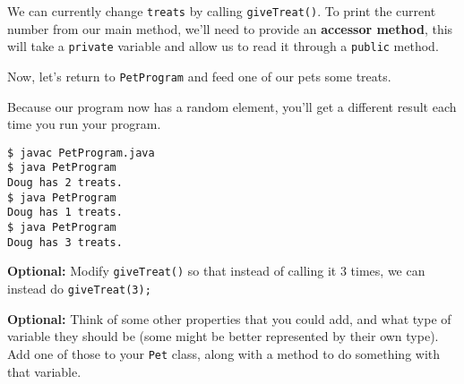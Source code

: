 			We can currently change \texttt{treats} by calling \texttt{giveTreat()}. To print the current number from our main method, we'll need to provide an \textbf{accessor method}, this will take a \texttt{private} variable and allow us to read it through a \texttt{public} method.
			
			
			
			Now, let's return to \texttt{PetProgram} and feed one of our pets some treats.
			
			
			
			Because our program now has a random element, you'll get a different result each time you run your program.
		
			\begin{lstlisting}[style=Terminal]
$ javac PetProgram.java
$ java PetProgram
Doug has 2 treats.
$ java PetProgram
Doug has 1 treats.
$ java PetProgram
Doug has 3 treats.
			\end{lstlisting}

			\textbf{Optional:} Modify \texttt{giveTreat()} so that instead of calling it 3 times, we can instead do \texttt{giveTreat(3);}
			
			\textbf{Optional:} Think of some other properties that you could add, and what type of variable they should be (some might be better represented by their own type). Add one of those to your \texttt{Pet} class, along with a method to do something with that variable.